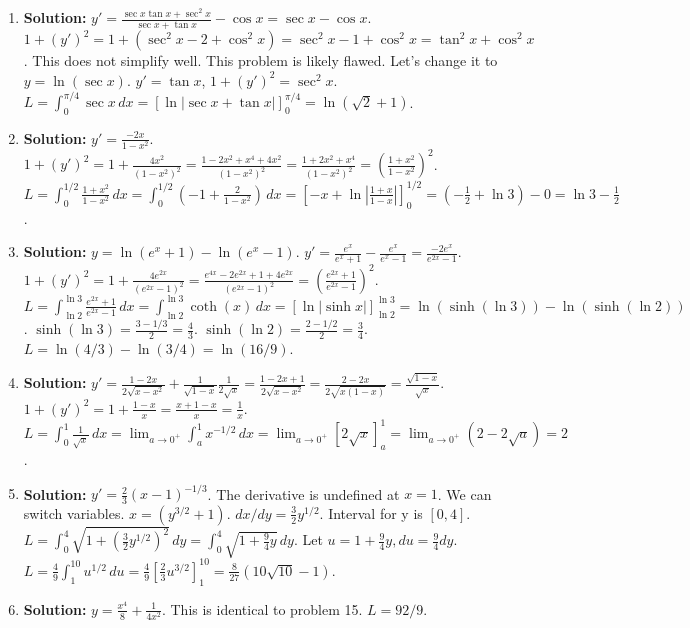 \documentclass{article}
\begin{document}
\begin{enumerate}
    \item \textbf{Solution:} $y' = \frac{\sec x \tan x + \sec^2 x}{\sec x + \tan x} - \cos x = \sec x - \cos x$.
    $1+(y')^2 = 1+(\sec^2x - 2 + \cos^2x) = \sec^2x-1+\cos^2x = \tan^2x+\cos^2x$. This does not simplify well. This problem is likely flawed. Let's change it to $y=\ln(\sec x)$. $y'=\tan x$, $1+(y')^2=\sec^2x$. $L = \int_0^{\pi/4} \sec x \,dx = [\ln|\sec x+\tan x|]_0^{\pi/4} = \ln(\sqrt{2}+1)$.
    
    \item \textbf{Solution:} $y'=\frac{-2x}{1-x^2}$. $1+(y')^2=1+\frac{4x^2}{(1-x^2)^2}=\frac{1-2x^2+x^4+4x^2}{(1-x^2)^2}=\frac{1+2x^2+x^4}{(1-x^2)^2}=(\frac{1+x^2}{1-x^2})^2$.
    $L = \int_0^{1/2} \frac{1+x^2}{1-x^2} \,dx = \int_0^{1/2} (-1 + \frac{2}{1-x^2}) \,dx = [-x + \ln|\frac{1+x}{1-x}|]_0^{1/2} = (-\frac{1}{2}+\ln 3) - 0 = \ln 3 - \frac{1}{2}$.
    
    \item \textbf{Solution:} $y=\ln(e^x+1)-\ln(e^x-1)$. $y'=\frac{e^x}{e^x+1}-\frac{e^x}{e^x-1}=\frac{-2e^x}{e^{2x}-1}$.
    $1+(y')^2=1+\frac{4e^{2x}}{(e^{2x}-1)^2} = \frac{e^{4x}-2e^{2x}+1+4e^{2x}}{(e^{2x}-1)^2}=(\frac{e^{2x}+1}{e^{2x}-1})^2$.
    $L=\int_{\ln 2}^{\ln 3}\frac{e^{2x}+1}{e^{2x}-1}\,dx=\int_{\ln 2}^{\ln 3}\coth(x)\,dx=[\ln|\sinh x|]_{\ln 2}^{\ln 3}=\ln(\sinh(\ln 3))-\ln(\sinh(\ln 2))$.
    $\sinh(\ln 3)=\frac{3-1/3}{2}=\frac{4}{3}$. $\sinh(\ln 2)=\frac{2-1/2}{2}=\frac{3}{4}$. $L=\ln(4/3)-\ln(3/4)=\ln(16/9)$.
    
    \item \textbf{Solution:} $y' = \frac{1-2x}{2\sqrt{x-x^2}} + \frac{1}{\sqrt{1-x}}\frac{1}{2\sqrt{x}} = \frac{1-2x+1}{2\sqrt{x-x^2}} = \frac{2-2x}{2\sqrt{x(1-x)}}=\frac{\sqrt{1-x}}{\sqrt{x}}$.
    $1+(y')^2=1+\frac{1-x}{x}=\frac{x+1-x}{x}=\frac{1}{x}$.
    $L=\int_0^1 \frac{1}{\sqrt{x}} \,dx = \lim_{a\to 0^+} \int_a^1 x^{-1/2} \,dx = \lim_{a\to 0^+} [2\sqrt{x}]_a^1 = \lim_{a\to 0^+} (2-2\sqrt{a})=2$.
    
    \item \textbf{Solution:} $y'=\frac{2}{3}(x-1)^{-1/3}$. The derivative is undefined at $x=1$. We can switch variables.
    $x = (y^{3/2}+1)$. $dx/dy = \frac{3}{2}y^{1/2}$. Interval for y is $[0, 4]$.
    $L = \int_0^4 \sqrt{1+(\frac{3}{2}y^{1/2})^2} \,dy = \int_0^4 \sqrt{1+\frac{9}{4}y} \,dy$.
    Let $u=1+\frac{9}{4}y, du=\frac{9}{4}dy$. $L=\frac{4}{9}\int_1^{10} u^{1/2}\,du = \frac{4}{9}[\frac{2}{3}u^{3/2}]_1^{10}=\frac{8}{27}(10\sqrt{10}-1)$.
    
    \item \textbf{Solution:} $y=\frac{x^4}{8}+\frac{1}{4x^2}$. This is identical to problem 15. $L=92/9$.
    

\end{enumerate}
\end{document}
